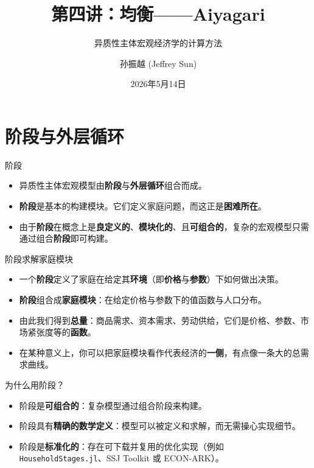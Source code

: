 \documentclass[10pt,aspectratio=169]{beamer}
\title{第四讲：均衡——Aiyagari}
\subtitle{异质性主体宏观经济学的计算方法}
\author{孙振越 (Jeffrey Sun)}
\institute{多伦多大学}
\date{2026年5月14日}
\begin{document}
\maketitle

\section{阶段与外层循环}

\begin{frame}{阶段}
  \begin{itemize}
    \item 异质性主体宏观模型由\textbf{阶段}与\textbf{外层循环}组合而成。
    \item \textbf{阶段}是基本的构建模块。它们定义家庭问题，而这正是\textbf{困难所在}。
    \item 由于\textbf{阶段}在概念上是\textbf{良定义的}、\textbf{模块化的}、且\textbf{可组合的}，复杂的宏观模型只需通过组合\textbf{阶段}即可构建。
  \end{itemize}
\end{frame}

\begin{frame}{阶段求解家庭模块}
  \begin{itemize}
    \item 一个\textbf{阶段}定义了家庭在给定其\textbf{环境}（即\textbf{价格}与\textbf{参数}）下如何做出决策。
    \item \textbf{阶段}组合成\textbf{家庭模块}：在给定价格与参数下的值函数与人口分布。
    \item 由此我们得到\textbf{总量}：商品需求、资本需求、劳动供给，它们是价格、参数、市场紧张度等的\textbf{函数}。
    \item 在某种意义上，你可以把家庭模块看作代表经济的\textbf{一侧}，有点像一条大的总需求曲线。
  \end{itemize}
\end{frame}

\begin{frame}{为什么用阶段？}
  \begin{itemize}
    \item 阶段是\textbf{可组合的}：复杂模型通过组合阶段来构建。
    \item 阶段具有\textbf{精确的数学定义}：模型可以被定义和求解，而无需操心实现细节。
    \item 阶段是\textbf{标准化的}：存在可下载并复用的优化实现（例如 \texttt{HouseholdStages.jl}、SSJ Toolkit 或 ECON-ARK）。
  \end{itemize}

\end{frame}
\end{document}
